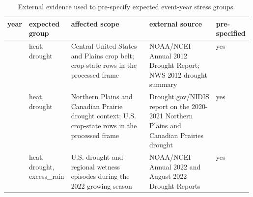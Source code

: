 \begin{table}[H]
\centering
\caption{External evidence used to pre-specify expected event-year stress groups.}
\label{tab:event_evidence_sources}
\small
\renewcommand{\arraystretch}{1.15}
\begin{tabularx}{\linewidth}{@{}>{\raggedright\arraybackslash}p{0.07\linewidth}>{\raggedright\arraybackslash}p{0.16\linewidth}X>{\raggedright\arraybackslash}p{0.26\linewidth}>{\raggedright\arraybackslash}p{0.09\linewidth}@{}}
\toprule
year & expected group & affected scope & external source & pre-specified \\
\midrule
2012 & heat, drought & Central United States and Plains crop belt; crop-state rows in the processed frame & NOAA/NCEI Annual 2012 Drought Report; NWS 2012 drought summary & yes \\
2021 & heat, drought & Northern Plains and Canadian Prairie drought context; U.S. crop-state rows in the processed frame & Drought.gov/NIDIS report on the 2020-2021 Northern Plains and Canadian Prairies drought & yes \\
2022 & heat, drought, excess\_rain & U.S. drought and regional wetness episodes during the 2022 growing season & NOAA/NCEI Annual 2022 and August 2022 Drought Reports & yes \\
\bottomrule
\end{tabularx}
\end{table}
